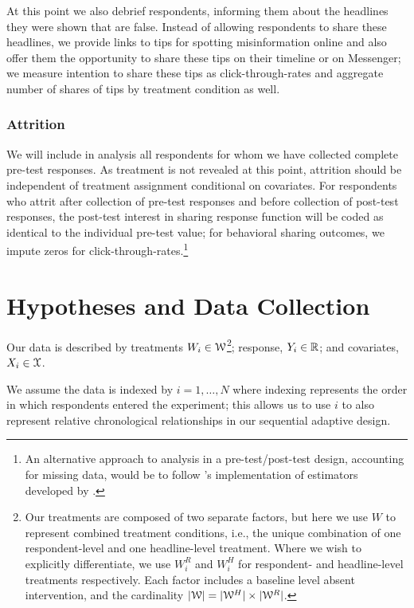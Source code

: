 \documentclass[letterpaper, 12pt, parskip=full,]{scrartcl}
\begin{document}
At this point we also debrief respondents, informing them about the headlines they were shown that are false. Instead of allowing respondents to share these headlines, we provide links to tips for spotting misinformation online and also offer them the opportunity to share these tips on their timeline or on Messenger; we measure intention to share these tips as click-through-rates and aggregate number of shares of tips by treatment condition as well. 


\subsubsection{Attrition} We will include in analysis all respondents for whom we have collected complete pre-test responses. As treatment is not revealed at this point, attrition should be independent of treatment assignment conditional on covariates. For respondents who attrit after collection of pre-test responses and before collection of post-test responses, the post-test interest in sharing response function will be coded as identical to the individual pre-test value; for behavioral sharing outcomes, we impute zeros for click-through-rates.\footnote{An alternative approach to analysis in a pre-test/post-test design, accounting for missing data, would be to follow \cite{davidian2005semiparametric}'s implementation of estimators developed by \cite{robins1994estimation}.}


\section{Hypotheses and Data Collection}



Our data is described by treatments $W_i \in {\EuScript W}$\footnote{Our treatments are composed of two separate factors, but here we use $W$ to represent combined treatment conditions, i.e., the unique combination of one respondent-level and one headline-level treatment. Where we wish to explicitly differentiate, we use $W^R_i$ and $W^H_i$ for respondent- and headline-level treatments respectively. Each factor includes a baseline level absent intervention, and the cardinality $|{\EuScript W}| = |{\EuScript W}^H|\times |{\EuScript W}^R|$.}; response,  $Y_i \in {\mathbb R}$; and covariates, $X_i \in {\EuScript X}$. 

We assume the data is indexed by $i = 1, \dots, N$ where indexing represents the order in which respondents entered the experiment; this allows us to use $i$ to also represent relative chronological relationships in our sequential adaptive design. 
\end{document}

